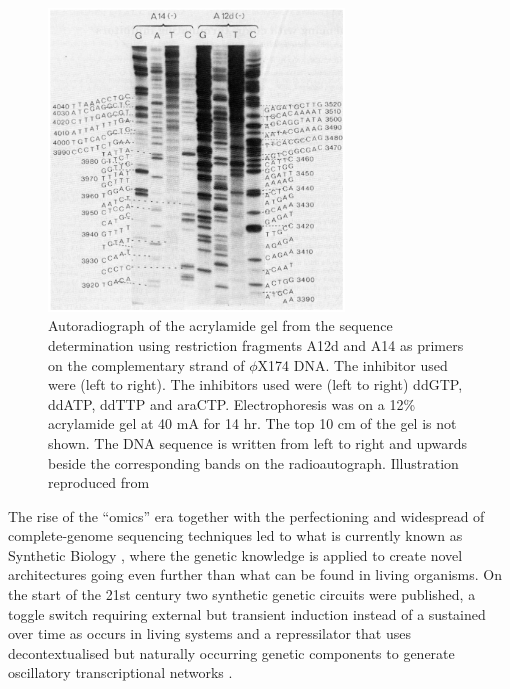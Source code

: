 \begin{figure}[!ht]
  \centering
  \includegraphics[width=0.7\textwidth]{introduction/chapter/figs/sanger.png}
  \caption{Autoradiograph of the acrylamide gel from the sequence determination using restriction fragments A12d and A14 as primers on the complementary strand of $\phi$X174 DNA. The inhibitor used were (left to right). The inhibitors used were (left to right) ddGTP, ddATP, ddTTP and araCTP. Electrophoresis was on a 12\% acrylamide gel at 40 mA for 14 hr. The top 10 cm of the gel is not shown. The DNA sequence is written from left to right and upwards beside the corresponding bands on the radioautograph. Illustration reproduced from \citet{sanger1977dna}}
  \label{fig.intro6}
\end{figure}

The rise of the “omics” era together with the perfectioning and widespread of complete-genome sequencing techniques led to what is currently known as Synthetic Biology \citep{cameron2014brief}, where the genetic knowledge is applied to create novel architectures going even further than what can be found in living organisms. On the start of the 21st century two synthetic genetic circuits were published, a toggle switch requiring external but transient induction instead of a sustained over time as occurs in living systems \citep{gardner2000construction} and a repressilator that uses decontextualised but naturally occurring genetic components to generate oscillatory transcriptional networks \citep{elowitz2000synthetic}.

